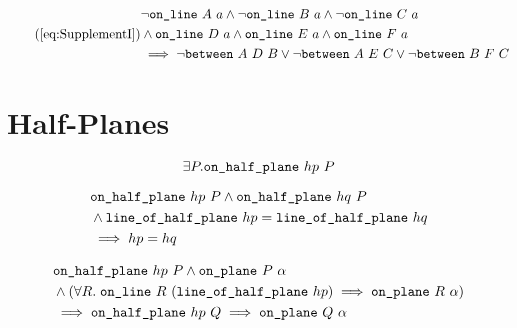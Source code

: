 \begin{equation}\tag{\ref{eq:SupplementI}}
  \begin{split}
    &\neg\code{on\_line}\ A\ a \wedge \neg\code{on\_line}\ B\ a \wedge \neg\code{on\_line}\ C\ a\\
    &\wedge \code{on\_line}\ D\ a \wedge \code{on\_line}\ E\ a \wedge \code{on\_line}\ F\ a\\
    &\implies \neg\between{A}{D}{B} \vee \neg\between{A}{E}{C} \vee \neg\between{B}{F}{C}
  \end{split}
\end{equation}

\section{Half-Planes}
\begin{equation}\label{eq:HalfPlaneNotEmpty}
  \exists P. \texttt{on\_half\_plane}\ hp\ P
\end{equation}

\begin{equation}\label{eq:onHalfPlaneDisjoint}
  \begin{split}
    &\texttt{on\_half\_plane}\ hp\ P \wedge \texttt{on\_half\_plane}\ hq\ P\\
    &\wedge\texttt{line\_of\_half\_plane}\ hp = \texttt{line\_of\_half\_plane}\ hq\\
    &\implies hp = hq
  \end{split}
\end{equation}

\begin{equation}\label{eq:halfPlaneOnPlane}
  \begin{split}
    &\texttt{on\_half\_plane}\ hp\ P \wedge \texttt{on\_plane}\ P\ \alpha \\
    &\wedge (\forall R.\;\texttt{on\_line}\ R\ (\texttt{line\_of\_half\_plane}\ hp) \implies \texttt{on\_plane}\ R\ \alpha) \\
    &\implies \texttt{on\_half\_plane}\ hp\ Q \implies \texttt{on\_plane}\ Q\ \alpha
  \end{split}
\end{equation}

